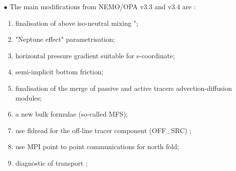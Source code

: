 \documentclass[NEMO_book]{subfiles}
\begin{document}
 \vspace{1cm}
$\bullet$ The main modifications from NEMO/OPA v3.3 and  v3.4 are :\\
\begin{enumerate}
\item finalisation of above iso-neutral mixing \citep{Griffies_al_JPO98}"; 
\item "Neptune effect" parametrisation;
\item horizontal pressure gradient suitable for s-coordinate; 
\item semi-implicit bottom friction;
\item finalisation of the merge of passive and active tracers advection-diffusion modules; 
\item a new bulk formulae (so-called MFS);
\item use fldread for the off-line tracer component (OFF\_SRC) ; 
\item use MPI point to point communications  for north fold;
\item diagnostic of transport ; 
\end{enumerate}
\end{document}
